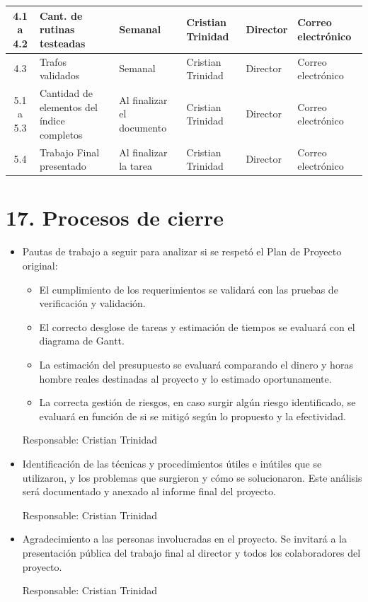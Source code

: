 \documentclass[11pt]{charter}
\begin{document}
\begin{table}[!htpb]
\begin{tabularx}{\linewidth}{@{}|c|X|X|X|X|X|@{}}
4.1 a 4.2 & Cant. de rutinas testeadas & Semanal & Cristian \newline Trinidad & Director & Correo electrónico \\ \hline
4.3 & Trafos validados & Semanal & Cristian \newline Trinidad & Director & Correo electrónico \\ \hline
5.1 a 5.3 & Cantidad de elementos del índice completos & Al finalizar el documento & Cristian \newline Trinidad & Director & Correo electrónico \\ \hline
5.4 & Trabajo Final presentado & Al finalizar la tarea & Cristian \newline Trinidad & Director & Correo electrónico \\ \hline
\end{tabularx}%
\end{table}


\section{17. Procesos de cierre}    
\label{sec:cierre}

\begin{itemize}
\item Pautas de trabajo a seguir para analizar si se respetó el Plan de Proyecto original:
\begin{itemize}
\item El cumplimiento de los requerimientos se validará con las pruebas de verificación y validación.
\item El correcto desglose de tareas y estimación de tiempos se evaluará con el diagrama de Gantt.
\item La estimación del presupuesto se evaluará comparando el dinero y horas hombre reales destinadas al proyecto y lo estimado oportunamente.
\item La correcta gestión de riesgos, en caso surgir algún riesgo identificado, se evaluará en función de si se mitigó según lo propuesto y la efectividad.
\end{itemize}
Responsable: Cristian Trinidad

\item Identificación de las técnicas y procedimientos útiles e inútiles que se utilizaron, y los problemas que surgieron y cómo se solucionaron. Este análisis será documentado y anexado al informe final del proyecto.

Responsable: Cristian Trinidad

\item Agradecimiento a las personas involucradas en el proyecto. Se invitará a la presentación pública del trabajo final al director y todos los colaboradores del proyecto.

Responsable: Cristian Trinidad

\end{itemize}
\end{document}

